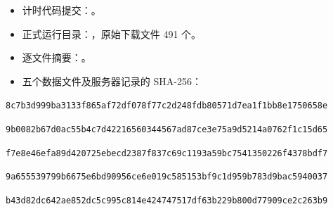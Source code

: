 \begin{itemize}
\item 计时代码提交：。
\item 正式运行目录：，原始下载文件 491 个。
\item 逐文件摘要：。
\item 五个数据文件及服务器记录的 SHA-256：\end{itemize}
\noindent{}\par
{\footnotesize\noindent\texttt{8c7b3d999ba3133f865af72df078f77c\allowbreak 2d248fdb80571d7ea1f1bb8e1750658e}\par}
\noindent{}\par
{\footnotesize\noindent\texttt{9b0082b67d0ac55b4c7d422165603445\allowbreak 67ad87ce3e75a9d5214a0762f1c15d65}\par}
\noindent{}\par
{\footnotesize\noindent\texttt{f7e8e46efa89d420725ebecd2387f837\allowbreak c69c1193a59bc7541350226f4378bdf7}\par}
\noindent{}\par
{\footnotesize\noindent\texttt{9a655539799b6675e6bd90956ce6e019\allowbreak c585153bf9c1d959b783d9bac5940037}\par}
\noindent{}\par
{\footnotesize\noindent\texttt{b43d82dc642ae852dc5c995c814e4247\allowbreak 47517df63b229b800d77909ce2c263b9}\par}
